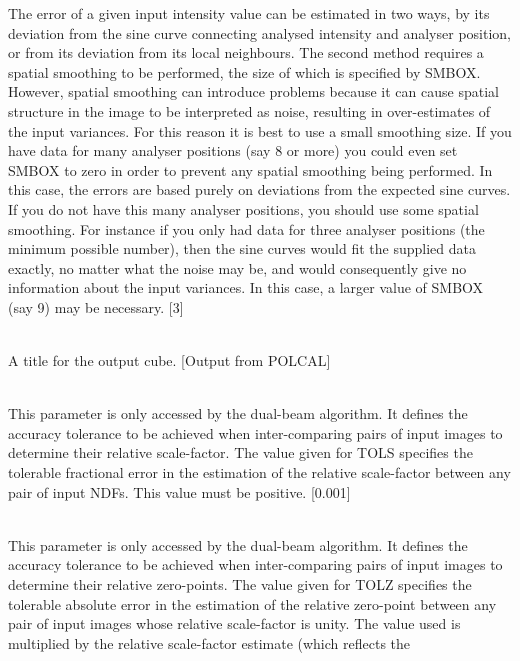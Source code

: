 \documentclass[twoside,11pt]{article}
\renewcommand{\_}{\texttt{\symbol{95}}}
\newcommand{\sstsubsection}[1]{ \item[{#1}] \mbox{} \\}
\newcommand{\sstsubsection}[1]{\item[{#1}]}
\begin{document}
{{{         The error of a given input intensity value can be estimated
         in two ways, by its deviation from the sine curve connecting
         analysed intensity and analyser position, or from its deviation
         from its local neighbours. The second method requires a spatial
         smoothing to be performed, the size of which is specified by
         SMBOX. However, spatial smoothing can introduce problems because
         it can cause spatial structure in the image to be interpreted as
         noise, resulting in over-estimates of the input variances. For
         this reason it is best to use a small smoothing size. If you
         have data for many analyser positions (say 8 or more) you could
         even set SMBOX to zero in order to prevent any spatial smoothing
         being performed. In this case, the errors are based purely on
         deviations from the expected sine curves. If you do not have
         this many analyser positions, you should use some spatial
         smoothing. For instance if you only had data for three analyser
         positions (the minimum possible number), then the sine curves
         would fit the supplied data exactly, no matter what the noise
         may be, and would consequently give no information about the input
         variances. In this case, a larger value of SMBOX (say 9) may be
         necessary. [3]
      }
      \sstsubsection{
         TITLE = LITERAL (Read)
      }{
         A title for the output cube. [Output from POLCAL]
      }
      \sstsubsection{
         TOLS = \_REAL (Read)
      }{
         This parameter is only accessed by the dual-beam algorithm. It
         defines the accuracy tolerance to be achieved when inter-comparing
         pairs of input images to determine their relative scale-factor. The
         value given for TOLS specifies the tolerable fractional error in the
         estimation of the relative scale-factor between any pair of input
         NDFs. This value must be positive. [0.001]
      }
      \sstsubsection{
         TOLZ = \_REAL (Read)
      }{
         This parameter is only accessed by the dual-beam algorithm. It
         defines the accuracy tolerance to be achieved when inter-comparing
         pairs of input images to determine their relative zero-points. The
         value given for TOLZ specifies the tolerable absolute error in the
         estimation of the relative zero-point between any pair of input
         images whose relative scale-factor is unity. The value used is
         multiplied by the relative scale-factor estimate (which reflects the
}}}
\end{document}
